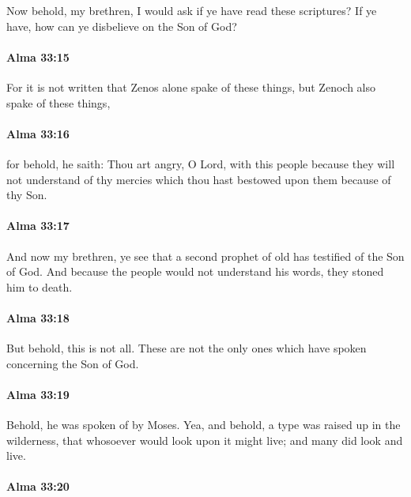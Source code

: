 			Now behold, my brethren, I would ask if ye have read these scriptures?
			If ye have, how can ye disbelieve on the Son of God?

		\paragraph{Alma 33:15} %
			\label{ALMA-33-15}

			For it is not written that Zenos alone spake of these things,
			but Zenoch also spake of these things,

		\paragraph{Alma 33:16} %
			\label{ALMA-33-16}

			for behold, he saith:
			Thou art angry, O Lord, with this people
			because they will not understand of thy mercies
			which thou hast bestowed upon them because of thy Son.

		\paragraph{Alma 33:17} %
			\label{ALMA-33-17}

			And now my brethren, ye see
			that a second prophet of old has testified of the Son of God.
			And because the people would not understand his words,
			they stoned him to death.

		\paragraph{Alma 33:18} %
			\label{ALMA-33-18}

			But behold, this is not all.
			These are not the only ones which have spoken concerning the Son of God.

		\paragraph{Alma 33:19} %
			\label{ALMA-33-19}

			Behold, he was spoken of by Moses.
			Yea, and behold, a type was raised up in the wilderness,
			that whosoever would look upon it might live;
			and many did look and live.

		\paragraph{Alma 33:20} %
			\label{ALMA-33-20}

